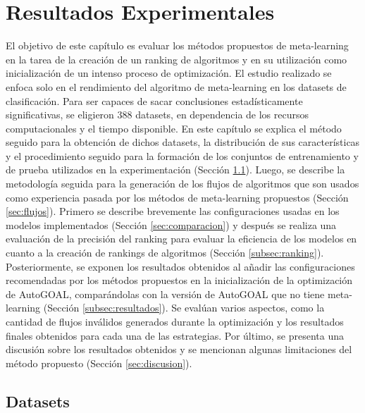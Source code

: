 \chapter{Resultados Experimentales}\label{chapter:results}

El objetivo de este capítulo es evaluar los métodos propuestos de meta-learning en la tarea de la creación de un ranking de algoritmos y en su utilización como inicialización de un intenso proceso de optimización. El estudio realizado se enfoca solo en el rendimiento del algoritmo de meta-learning en los datasets de clasificación. Para ser capaces de sacar conclusiones estadísticamente significativas, se eligieron 388 datasets, en dependencia de los recursos computacionales y el tiempo disponible. En este capítulo se explica el método seguido para la obtención de dichos datasets, la distribución de sus características y el procedimiento seguido para la formación de los conjuntos de entrenamiento y de prueba utilizados en la experimentación (Sección \ref{sec:datasets}). Luego, se describe la metodología seguida para la generación de los flujos de algoritmos que son usados como experiencia pasada por los métodos de meta-learning propuestos (Sección \ref{sec:flujos}). Primero se describe brevemente las configuraciones usadas en los modelos implementados (Sección \ref{sec:comparacion}) y después se realiza una evaluación de la precisión del ranking para evaluar la eficiencia de los modelos en cuanto a la creación de rankings de algoritmos (Sección \ref{subsec:ranking}). Posteriormente, se exponen los resultados obtenidos al añadir las configuraciones recomendadas por los métodos propuestos en la inicialización de la optimización de AutoGOAL, comparándolas con la versión de AutoGOAL que no tiene meta-learning (Sección \ref{subsec:resultados}). Se evalúan varios aspectos, como la cantidad de flujos inválidos generados durante la optimización y los resultados finales obtenidos para cada una de las estrategias. Por último, se presenta una discusión sobre los resultados obtenidos y se mencionan algunas limitaciones del método propuesto (Sección \ref{sec:discusion}).


\section{Datasets}\label{sec:datasets}

%
%
%

